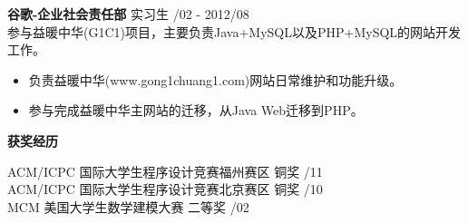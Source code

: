 \documentclass[a4paper]{article}
\newenvironment{changemargin}[2]{%
  \begin{list}{}{%
    \setlength{\topsep}{0pt}%
    \setlength{\leftmargin}{#1}%
    \setlength{\rightmargin}{#2}%
    \setlength{\listparindent}{\parindent}%
    \setlength{\itemindent}{\parindent}%
    \setlength{\parsep}{\parskip}%
  }%
  \item[]}{\end{list}
}
\newcommand{\lineover}{
	\begin{changemargin}{-0.05in}{-0.05in}
		\vspace*{-8pt}
		\hrulefill \\
		\vspace*{-2pt}
	\end{changemargin}
}
\newcommand{\header}[1]{
	\begin{changemargin}{-0.5in}{-0.5in}
	\fontsize{12}{14} \scshape{\textbf{#1}}\\
	\end{changemargin}
}
\newenvironment{body} {
	\vspace*{-16pt}
	\begin{changemargin}{-0.5in}{-0.5in}
  }	
	{\end{changemargin}
}
\begin{document}
\begin{body}
	\vspace{10pt}
	\textbf{谷歌-企业社会责任部} \hfill 实习生 {/02 - 2012/08}\\ 
	\smallskip
	参与益暖中华{\fontarial (G1C1)}项目，主要负责{\fontarial Java+MySQL}以及{\fontarial PHP+MySQL}的网站开发工作。\\ 
	\vspace*{-6pt}
	\begin{itemize} \itemsep -0pt  %
		\item 负责益暖中华{\fontarial(www.gong1chuang1.com)}网站日常维护和功能升级。\\
	\end{itemize}
	\vspace*{-12pt}
	\begin{itemize} \itemsep -0pt  %
		\item 参与完成益暖中华主网站的迁移，从{\fontarial Java Web}迁移到{\fontarial PHP}。\\
	\end{itemize}

\end{body}

\medskip




\header{获奖经历}
\begin{body}
	\vspace{14pt}
	{{\fontarial ACM/ICPC} 国际大学生程序设计竞赛福州赛区 铜奖} \hfill {/11}\\
	{{\fontarial ACM/ICPC} 国际大学生程序设计竞赛北京赛区 铜奖} \hfill {/10}\\
	{{\fontarial MCM} 美国大学生数学建模大赛 二等奖} \hfill {/02}\\
\end{body}
\end{document}
